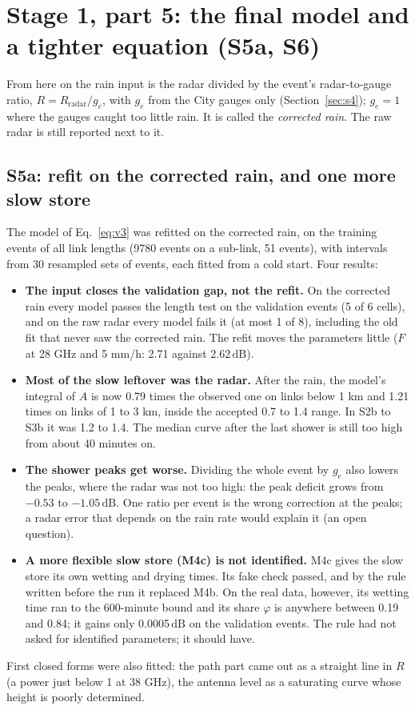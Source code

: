 \documentclass[11pt,a4paper]{article}
\newcommand{\dB}{\,\mathrm{dB}}
\begin{document}
\section{Stage 1, part 5: the final model and a tighter equation (S5a, S6)}
\label{sec:final}

From here on the rain input is the radar divided by the event's radar-to-gauge ratio, $R = R_{\mathrm{radar}}/g_e$,
with $g_e$ from the City gauges only (Section~\ref{sec:s4}); $g_e = 1$ where the gauges caught too little rain. It is
called the \emph{corrected rain}. The raw radar is still reported next to it.

\subsection{S5a: refit on the corrected rain, and one more slow store}
\label{sec:s5a}

The model of Eq.~\eqref{eq:v3} was refitted on the corrected rain, on the training events of all link lengths (9780
events on a sub-link, 51 events), with intervals from 30 resampled sets of events, each fitted from a cold start. Four
results:
\begin{itemize}
\item \textbf{The input closes the validation gap, not the refit.} On the corrected rain every model passes the length
test on the validation events (5 of 6 cells), and on the raw radar every model fails it (at most 1 of 8), including
the old fit that never saw the corrected rain. The refit moves the parameters little ($F$ at 28 GHz and 5 mm/h:
2.71 against 2.62$\dB$).
\item \textbf{Most of the slow leftover was the radar.} After the rain, the model's integral of $A$ is now 0.79 times
the observed one on links below 1 km and 1.21 times on links of 1 to 3 km, inside the accepted 0.7 to 1.4 range. In
S2b to S3b it was 1.2 to 1.4. The median curve after the last shower is still too high from about 40 minutes on.
\item \textbf{The shower peaks get worse.} Dividing the whole event by $g_e$ also lowers the peaks, where the radar was
not too high: the peak deficit grows from $-0.53$ to $-1.05\dB$. One ratio per event is the wrong correction at the
peaks; a radar error that depends on the rain rate would explain it (an open question).
\item \textbf{A more flexible slow store (M4c) is not identified.} M4c gives the slow store its own wetting and drying
times. Its fake check passed, and by the rule written before the run it replaced M4b. On the real data, however, its
wetting time ran to the 600-minute bound and its share $\varphi$ is anywhere between 0.19 and 0.84; it gains only
0.0005$\dB$ on the validation events. The rule had not asked for identified parameters; it should have.
\end{itemize}
First closed forms were also fitted: the path part came out as a straight line in $R$ (a power just below 1 at
38 GHz), the antenna level as a saturating curve whose height is poorly determined.
\end{document}
